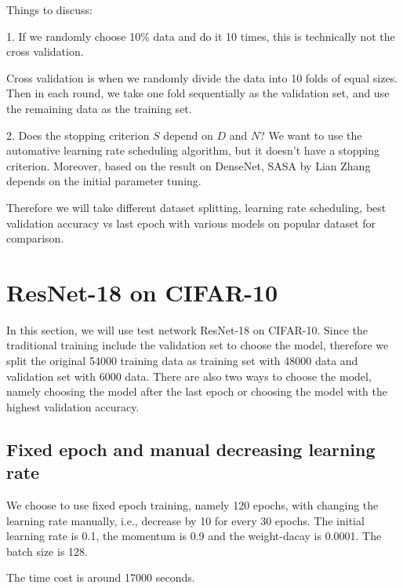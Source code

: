 Things to discuss:

1. If we randomly choose 10\% data and do it 10 times, this is technically not the cross validation. 

Cross validation is when we randomly divide the data into 10 folds of equal sizes. Then in each round, we take one fold  sequentially as the validation set, and use the remaining data as the training set.

2. Does the stopping criterion $S$ depend on $D$ and $N$? We want to use the automative learning rate scheduling algorithm, but it doesn't have a stopping criterion. Moreover, based on the result on DenseNet, SASA by Lian Zhang depends on the initial parameter tuning.

Therefore we will take different dataset splitting, learning rate scheduling, best validation accuracy vs last epoch with various models on popular dataset for comparison.



\section{ResNet-18 on CIFAR-10}
In this section, we will use test network ResNet-18 on CIFAR-10. Since the traditional training include the validation set to choose the model, therefore we split the original 54000 training data as training set with 48000 data and validation set with 6000 data. There are also two ways to choose the model, namely choosing the model after the last epoch or choosing the model with the highest validation accuracy. 


\subsection{Fixed epoch and manual decreasing learning rate}
We choose to use fixed epoch training, namely 120 epochs, with changing the learning rate manually, i.e., decrease by 10 for every 30 epochs. The initial learning rate is 0.1, the momentum is 0.9 and the weight-dacay is 0.0001. The batch size is 128.

The time cost is around 17000 seconds.

